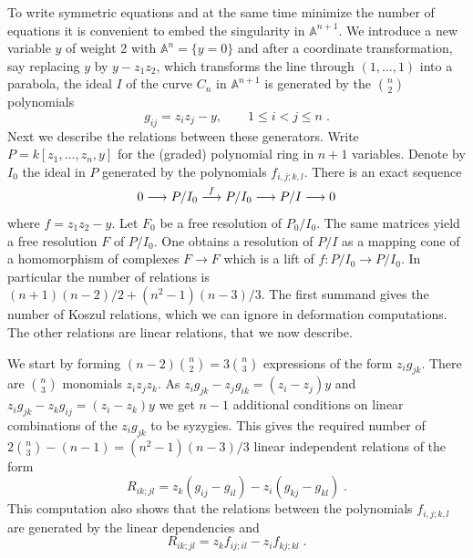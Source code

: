\documentclass[12pt,a4paper]{amsart}  %
\def\mapright#1{\mathrel{%
\smash{\mathop{\longrightarrow}\limits^{#1}}}}
\newcommand{\A}{\mathbb{A}}
\newcommand{\lra}{\longrightarrow}
\theoremstyle{definition}
\theoremstyle{remark}
\begin{document}
%
To write symmetric equations and at the same time minimize the number
of equations it is convenient to embed the singularity in $\A^{n+1}$. We introduce
a new variable $y$ of weight 2 with $\A^{n}=\{y=0\}$ and after a
coordinate transformation, say replacing $y$ by $y-z_1z_2$, which transforms
the line through $(1,\dots,1)$ into a parabola, the ideal $I$ of the curve $C_n$
in $\A^{n+1}$ is generated by
the $\binom{n}2$ polynomials
\[
g_{ij}=z_iz_j-y, \qquad 1\leq i<j\leq n \;.
\]
Next we describe the relations between these generators.
Write $P=k[z_1,\dots,z_n,y]$ for the (graded) polynomial ring in $n+1$ variables.
Denote by $I_0$ the ideal in $P$ generated by the polynomials $f_{i,j;k,l} $.
There is an exact sequence
\[
0 \lra P/I_0 \mapright f P/I_0 \lra P/I \lra 0
\]
where $f=z_1z_2-y$.
Let $F_0$ be  a free resolution of $P_0/I_0$. The same matrices yield a free resolution $F$
of $P/I_0$.   One obtains a resolution of $P/I$
as a mapping cone of a homomorphism of complexes $F\to F$ which is a lift of
$f\colon P/I_0 \to P/I_0$. In particular the number of relations is
$(n+1)(n-2)/2+(n^2-1)(n-3)/3$. The first summand gives the number of 
Koszul relations, which we can ignore in deformation computations. The other 
relations are linear relations, that we now describe.

We start by forming $(n-2)\binom n2=3\binom n3$ expressions of the form $z_ig_{jk}$.
There are $\binom n3$ monomials $z_iz_jz_k$. As 
$z_ig_{jk}-z_jg_{ik}=(z_i-z_j)y$ and $z_ig_{jk}-z_kg_{ij}=(z_i-z_k)y$ we get
$n-1$ additional conditions on linear combinations of the $z_ig_{jk}$ to be
syzygies. This gives the required number of $2\binom n3 -(n-1)=(n^2-1)(n-3)/3$
linear independent relations of the form
\[
R_{ik;jl}= z_k(g_{ij}-g_{il})-z_i(g_{kj}-g_{kl})\;.
\]
This computation also shows that the relations between the polynomials
$f_{i,j;k,l}$ are generated by the linear dependencies and
\[
R_{ik;jl}= z_kf_{ij;il}-z_if_{kj;kl}\;.
\]
\end{document}
